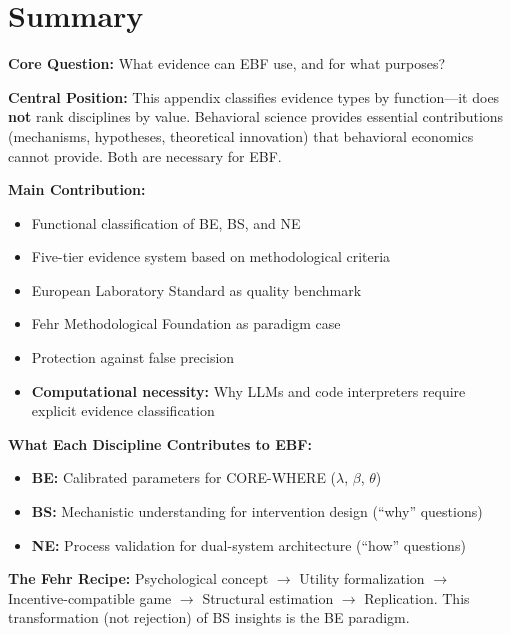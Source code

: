 \documentclass[11pt, a4paper]{article}
\begin{document}
\section{Summary}
\label{sec:evd-summary}

\begin{tcolorbox}[colback=green!10!white, colframe=green!75!black,
    title=\textbf{Appendix XX: Summary}]

\textbf{Core Question:} What evidence can EBF use, and for what purposes?

\textbf{Central Position:} This appendix classifies evidence types by function---it does \textbf{not} rank disciplines by value. Behavioral science provides essential contributions (mechanisms, hypotheses, theoretical innovation) that behavioral economics cannot provide. Both are necessary for EBF.

\textbf{Main Contribution:}
\begin{itemize}[nosep]
    \item Functional classification of BE, BS, and NE
    \item Five-tier evidence system based on methodological criteria
    \item European Laboratory Standard as quality benchmark
    \item Fehr Methodological Foundation as paradigm case
    \item Protection against false precision
    \item \textbf{Computational necessity:} Why LLMs and code interpreters require explicit evidence classification
\end{itemize}

\textbf{What Each Discipline Contributes to EBF:}
\begin{itemize}[nosep]
    \item \textbf{BE:} Calibrated parameters for CORE-WHERE ($\lambda$, $\beta$, $\theta$)
    \item \textbf{BS:} Mechanistic understanding for intervention design (``why'' questions)
    \item \textbf{NE:} Process validation for dual-system architecture (``how'' questions)
\end{itemize}

\textbf{The Fehr Recipe:} Psychological concept $\to$ Utility formalization $\to$ Incentive-compatible game $\to$ Structural estimation $\to$ Replication. This transformation (not rejection) of BS insights is the BE paradigm.


\end{tcolorbox}
\end{document}
